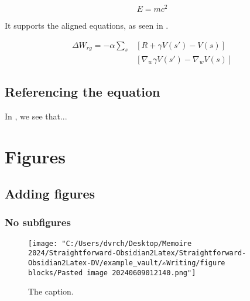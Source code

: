 \documentclass{extarticle}
\def\oldbibitem{} \let\oldbibitem=\\bibitem
\def\\bibitem{\stepcounter{citnum}\oldbibitem}
\begin{document}
\begin{equation} \label{eq:Einstein}
	E=mc^{2}
\end{equation}





It supports the aligned equations, as seen in .




\begin{equation}\label{eq:1}
\begin{aligned}
\Delta W_{rg} = -\alpha \sum_{s}&[R+\gamma V(s')-V(s)]  \\
&[\nabla_{w} \gamma V(s')-\nabla_{w}V(s)]
\end{aligned}
\end{equation}



\subsection{Referencing the equation}

In , we see that...

\section{Figures}

\subsection{Adding figures}

\subsubsection{No subfigures}


\begin{figure}[htb]
\centering
\texttt{[image: "C:/Users/dvrch/Desktop/Memoire 2024/Straightforward-Obsidian2Latex/Straightforward-Obsidian2Latex-DV/example\_vault/✍Writing/figure blocks/Pasted image 20240609012140.png"]}
\caption[]{The caption.}

\label{fig:gradient_steps}
\end{figure}
\end{document}

